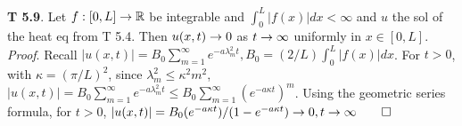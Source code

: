 {\bf T 5.9}. Let $f: [0,L] \rightarrow \mathbb{R}$ be integrable and $\int_0^L|f(x)|dx<\infty$ and $u$ the sol of the heat eq from T 5.4.  Then $u(x,t) \rightarrow 0$ as $t \rightarrow \infty$ uniformly in $x \in [0,L]$. {\it Proof}. Recall  $|u(x, t)|=B_0 \sum_{m=1}^{\infty} e^{-a \lambda_m^2 t}, B_0=(2/L) \int_0^L |f(x)|dx$. For $t > 0$, with $\kappa = (\pi/L)^2$, since $\lambda_m^2 \leq \kappa^2m^2$, $|u(x, t)|=B_0 \sum_{m=1}^{\infty} e^{-a \lambda_m^2 t} \leq B_0 \sum_{m=1}^{\infty} (e^{-a \kappa t})^m$. Using the geometric series formula, for $t >0$, $|u(x, t)|=B_0 (e^{-a \kappa t})/(1-e^{-a \kappa t}) \rightarrow 0, t \rightarrow \infty \qed$
